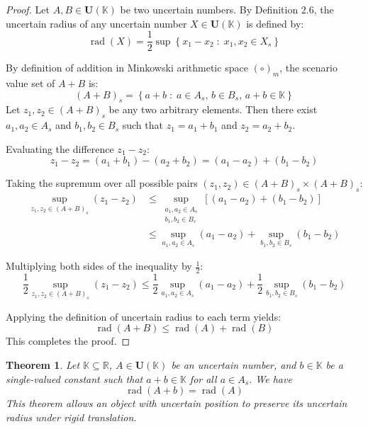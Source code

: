 \documentclass[a4paper,12pt,twoside]{memoir}
\newtheorem{theorem}{Theorem}[chapter]
\DeclareMathOperator{\rad}{rad}
\newcommand{\set}[1]{\left\{#1\right\}} %
\newcommand{\tsbd}[1]{\mathbf{U}(\mathbb{#1})}
\begin{document}
	\begin{proof}
		Let $A, B \in \tsbd{K}$ be two uncertain numbers. By Definition 2.6, the uncertain radius of any uncertain number $X \in \tsbd{K}$ is defined by:
		\[
		\rad(X) = \frac{1}{2} \sup \set{x_1 - x_2 \;:\; x_1, x_2 \in X_s}
		\]
		
		By definition of addition in Minkowski arithmetic space $(\circ)_m$, the scenario value set of $A + B$ is:
		\[
		(A + B)_s = \set{a + b \;:\; a \in A_s, \, b \in B_s, \, a + b \in \mathbb{K}}
		\]
		Let $z_1, z_2 \in (A + B)_s$ be any two arbitrary elements. Then there exist $a_1, a_2 \in A_s$ and $b_1, b_2 \in B_s$ such that $z_1 = a_1 + b_1$ and $z_2 = a_2 + b_2$.
		
		Evaluating the difference $z_1 - z_2$:
		\[
		z_1 - z_2 = (a_1 + b_1) - (a_2 + b_2) = (a_1 - a_2) + (b_1 - b_2)
		\]
		
		Taking the supremum over all possible pairs $(z_1, z_2) \in (A + B)_s \times (A + B)_s$:
		\begin{align*}
			\sup_{z_1, z_2 \in (A + B)_s} (z_1 - z_2) & \le \sup_{\substack{a_1, a_2 \in A_s                                            \\ b_1, b_2 \in B_s}} \left[ (a_1 - a_2) + (b_1 - b_2) \right] \\
			& \le \sup_{a_1, a_2 \in A_s} (a_1 - a_2) + \sup_{b_1, b_2 \in B_s} (b_1 - b_2)
		\end{align*}
		
		Multiplying both sides of the inequality by $\frac{1}{2}$:
		\[
		\frac{1}{2} \sup_{z_1, z_2 \in (A + B)_s} (z_1 - z_2) \le \frac{1}{2} \sup_{a_1, a_2 \in A_s} (a_1 - a_2) + \frac{1}{2} \sup_{b_1, b_2 \in B_s} (b_1 - b_2)
		\]
		
		Applying the definition of uncertain radius to each term yields:
		\[
		\rad(A + B) \le \rad(A) + \rad(B)
		\]
		This completes the proof.
	\end{proof}
	\begin{theorem}
		Let $\mathbb{K} \subseteq \mathbb{R}$, $A \in \tsbd{K}$ be an uncertain number, and $b \in \mathbb{K}$ be a single-valued constant such that $a + b \in \mathbb{K}$ for all $a \in A_s$. We have
		$$\rad(A+b) = \rad(A)$$
		This theorem allows an object with uncertain position to preserve its uncertain radius under rigid translation.
	\end{theorem}
\end{document}
